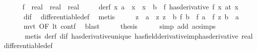 \begin{isabellebody}
%
\isadelimproof
%
\endisadelimproof
%
\isatagproof
{}\isamarkupfalse%
\ {\isacharminus}{\kern0pt}\isanewline
\ \ \isamarkupfalse%
\ f{\isacharprime}{\kern0pt}\ {\isacharcolon}{\kern0pt}{\isacharcolon}{\kern0pt}\ {\isachardoublequoteopen}real\ {\isasymRightarrow}\ real\ {\isasymRightarrow}\ real{\isachardoublequoteclose}\isanewline
\ \ \ \ \ derf{\isacharcolon}{\kern0pt}\ {\isachardoublequoteopen}{\isasymAnd}x{\isachardot}{\kern0pt}\ a\ {\isacharless}{\kern0pt}\ x\ {\isasymLongrightarrow}\ x\ {\isacharless}{\kern0pt}\ b\ {\isasymLongrightarrow}\ {\isacharparenleft}{\kern0pt}f\ has{\isacharunderscore}{\kern0pt}derivative\ f{\isacharprime}{\kern0pt}\ x{\isacharparenright}{\kern0pt}\ {\isacharparenleft}{\kern0pt}at\ x{\isacharparenright}{\kern0pt}{\isachardoublequoteclose}\isanewline
\ \ \ \ \isamarkupfalse%
\ dif\ \isamarkupfalse%
\ differentiable{\isacharunderscore}{\kern0pt}def\ \isamarkupfalse%
\ metis\isanewline
\ \ \isamarkupfalse%
\ \isamarkupfalse%
\ z\ \ {\isachardoublequoteopen}a\ {\isacharless}{\kern0pt}\ z{\isachardoublequoteclose}\ {\isachardoublequoteopen}z\ {\isacharless}{\kern0pt}\ b{\isachardoublequoteclose}\ {\isachardoublequoteopen}f\ b\ {\isacharminus}{\kern0pt}\ f\ a\ {\isacharequal}{\kern0pt}\ {\isacharparenleft}{\kern0pt}f{\isacharprime}{\kern0pt}\ z{\isacharparenright}{\kern0pt}\ {\isacharparenleft}{\kern0pt}b\ {\isacharminus}{\kern0pt}\ a{\isacharparenright}{\kern0pt}{\isachardoublequoteclose}\isanewline
\ \ \ \ \isamarkupfalse%
\ mvt\ {\isacharbrackleft}{\kern0pt}OF\ lt\ contf{\isacharbrackright}{\kern0pt}\ \isamarkupfalse%
\ blast\isanewline
\ \ \isamarkupfalse%
\ \isamarkupfalse%
\ {\isacharquery}{\kern0pt}thesis\isanewline
\ \ \ \ \isamarkupfalse%
\ {\isacharparenleft}{\kern0pt}simp\ add{\isacharcolon}{\kern0pt}\ ac{\isacharunderscore}{\kern0pt}simps{\isacharparenright}{\kern0pt}\isanewline
\ \ \ \ \ \ {\isacharparenleft}{\kern0pt}metis\ derf\ dif\ has{\isacharunderscore}{\kern0pt}derivative{\isacharunderscore}{\kern0pt}unique\ has{\isacharunderscore}{\kern0pt}field{\isacharunderscore}{\kern0pt}derivative{\isacharunderscore}{\kern0pt}imp{\isacharunderscore}{\kern0pt}has{\isacharunderscore}{\kern0pt}derivative\ real{\isacharunderscore}{\kern0pt}differentiable{\isacharunderscore}{\kern0pt}def{\isacharparenright}{\kern0pt}\isanewline
{}\isamarkupfalse%
%
\endisatagproof
{\isafoldproof}%

\end{isabellebody}

